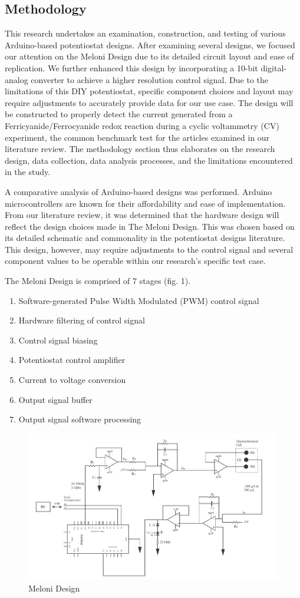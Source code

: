 \documentclass{article}
\begin{document}
\subsection*{Methodology}
This research undertakes an examination, construction, and testing of various Arduino-based potentiostat designs. After examining several designs, we focused our attention on the Meloni Design due to its detailed circuit layout and ease of replication. We further enhanced this design by incorporating a 10-bit digital-analog converter to achieve a higher resolution control signal. Due to the limitations of this DIY potentiostat, specific component choices and layout may require adjustments to accurately provide data for our use case. The design will be constructed to properly detect the current generated from a Ferricyanide/Ferrocyanide redox reaction during a cyclic voltammetry (CV) experiment, the common benchmark test for the articles examined in our literature review. The methodology section thus elaborates on the research design, data collection, data analysis processes, and the limitations encountered in the study.

A comparative analysis of Arduino-based designs was performed. Arduino microcontrollers are known for their affordability and ease of implementation. From our literature review, it was determined that the hardware design will reflect the design choices made in The Meloni Design. This was chosen based on its detailed schematic and commonality in the potentiostat designs literature. This design, however, may require adjustments to the control signal and several component values to be operable within our research's specific test case.

The Meloni Design is comprised of 7 stages (fig. 1).
\begin{enumerate}
    \item Software-generated Pulse Width Modulated (PWM) control signal
    \item Hardware filtering of control signal
    \item Control signal biasing
    \item Potentiostat control amplifier
    \item Current to voltage conversion
    \item Output signal buffer
    \item Output signal software processing
\end{enumerate}

\begin{figure}[H]
    \centering
    \includegraphics[width=.7\linewidth]{meloni_design.png}
    \caption{Meloni Design}
\end{figure}
\end{document}
